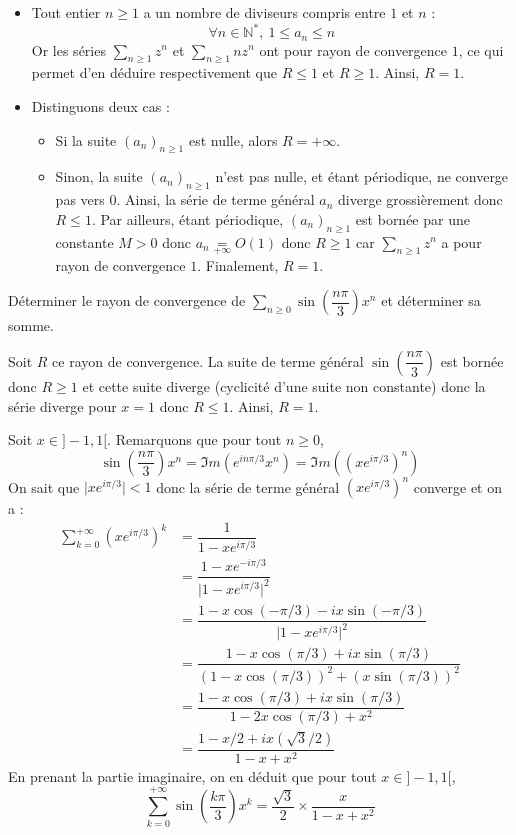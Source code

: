 \documentclass[a4paper,10pt]{report}
\newcommand{\Sum}[2]{\ensuremath{\textstyle{\sum\limits_{#1}^{#2}}}}
\begin{document}
\newpage

\corr 
\begin{itemize}
\item Tout entier $n\geq 1$ a un nombre de diviseurs compris entre $1$ et $n$ :
\[
\forall n\in\mathbb{N}^*,\ 1\leq a_n \leq n
\]
Or les séries $\Sum{n\geq 1}{} z^n$ et $\Sum{n\geq 1}{}n z^n$ ont pour rayon de convergence $1$, ce qui permet d'en déduire respectivement que $R\leq 1$ et $R\geq 1$.  Ainsi, $R=1$.
\item Distinguons deux cas :
\begin{itemize}
\item Si la suite $(a_n)_{n\geq 1}$ est nulle, alors $R=+\infty$.
\item Sinon, la suite $(a_n)_{n\geq 1}$ n'est pas nulle, et étant périodique, ne converge pas vers $0$. Ainsi, la série de terme général $a_n$ diverge grossièrement donc $R\leq 1$. Par ailleurs, étant périodique, $(a_n)_{n\geq 1}$ est bornée par une constante $M>0$ donc $a_n  \underset{+ \infty}{=} O(1)$ donc $R \geq 1$ car $\Sum{n\geq 1}{} z^n$ a pour rayon de convergence $1$. Finalement, $R=1$.
\end{itemize}
\end{itemize}

\begin{Exercice}{}
Déterminer le rayon de convergence de $\Sum{n\geq 0}{} \sin \left( \dfrac{n \pi}{3} \right) x^n$ et déterminer sa somme.
\end{Exercice}

\corr Soit $R$ ce rayon de convergence. La suite de terme général $\sin \left( \dfrac{n \pi}{3} \right)$ est bornée donc $R \geq 1$ et cette suite diverge (cyclicité d'une suite non constante) donc la série diverge pour $x=1$ donc $R \leq 1$. Ainsi, $R=1$.

\medskip

\noindent Soit $x \in ]-1,1[$. Remarquons que pour tout $n \geq 0$,
$$ \sin \left( \dfrac{n \pi}{3} \right) x^n = \Im m (e^{in \pi/3} x^n) = \Im m ((xe^{i \pi/3})^n)$$
On sait que $\vert xe^{i \pi/3} \vert <1$ donc la série de terme général $(xe^{i \pi/3})^n$ converge et on a :
\begin{align*}
\sum_{k=0}^{+ \infty} (xe^{i \pi/3})^k & = \dfrac{1}{1-xe^{i \pi/3}} \\
& = \dfrac{1-xe^{-i \pi/3}}{\vert 1-x e^{i \pi/3}\vert^2} \\
& = \dfrac{1-x \cos(-\pi/3)-i x\sin(-\pi/3)}{\vert 1-x e^{i \pi/3}\vert^2} \\
& = \dfrac{1-x \cos(\pi/3)+i x\sin(\pi/3)}{(1-x \cos(\pi/3))^2+ (x\sin(\pi/3))^2} \\
& = \dfrac{1-x \cos(\pi/3)+i x\sin(\pi/3)}{1-2x \cos(\pi/3)+x^2} \\
& = \dfrac{1-x/2 +i x(\sqrt{3}/2)}{1-x+x^2} 
\end{align*}
En prenant la partie imaginaire, on en déduit que pour tout $x \in ]-1,1[$,
$$ \sum_{k=0}^{+ \infty} \sin \left( \dfrac{k \pi}{3} \right) x^k =\dfrac{\sqrt{3}}{2} \times \dfrac{x}{1-x+x^2}$$
\end{document}
